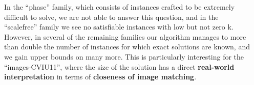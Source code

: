 \documentclass[a0paper]{tikzposter}
\begin{document}
\begin{columns}
{\bigskip

\begin{center}

\end{center}

\bigskip

In the ``phase'' family, which consists of instances
crafted to be extremely difficult to solve, we are not able
to answer this question, and in the ``scalefree'' family we
see no satisfiable instances with low but not zero k. 
However, in several of the remaining families our algorithm manages to more than double
the number of instances for which exact solutions are
known, and we gain upper bounds on many more. This is particularly
interesting for the ``images-CVIU11'', where the size of the solution has a
direct \textbf{real-world interpretation} in terms of \textbf{closeness of image
matching}.

}

\end{columns}
\end{document}
